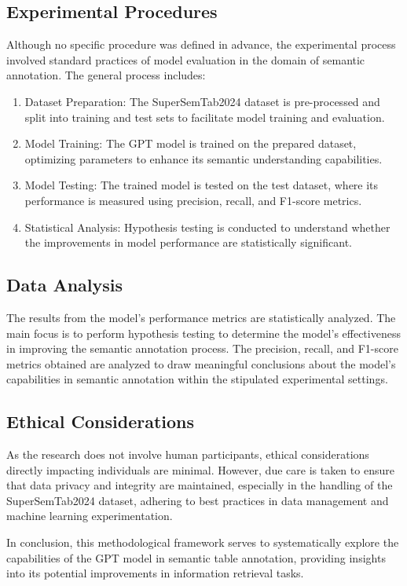\documentclass{article}
\begin{document}
\subsection{Experimental Procedures}
Although no specific procedure was defined in advance, the experimental process involved standard practices of model evaluation in the domain of semantic annotation. The general process includes:

\begin{enumerate}
    \item Dataset Preparation: The SuperSemTab2024 dataset is pre-processed and split into training and test sets to facilitate model training and evaluation.
    \item Model Training: The GPT model is trained on the prepared dataset, optimizing parameters to enhance its semantic understanding capabilities.
    \item Model Testing: The trained model is tested on the test dataset, where its performance is measured using precision, recall, and F1-score metrics.
    \item Statistical Analysis: Hypothesis testing is conducted to understand whether the improvements in model performance are statistically significant.
\end{enumerate}

\subsection{Data Analysis}
The results from the model’s performance metrics are statistically analyzed. The main focus is to perform hypothesis testing to determine the model’s effectiveness in improving the semantic annotation process. The precision, recall, and F1-score metrics obtained are analyzed to draw meaningful conclusions about the model’s capabilities in semantic annotation within the stipulated experimental settings.

\subsection{Ethical Considerations}
As the research does not involve human participants, ethical considerations directly impacting individuals are minimal. However, due care is taken to ensure that data privacy and integrity are maintained, especially in the handling of the SuperSemTab2024 dataset, adhering to best practices in data management and machine learning experimentation.

In conclusion, this methodological framework serves to systematically explore the capabilities of the GPT model in semantic table annotation, providing insights into its potential improvements in information retrieval tasks.
\end{document}
